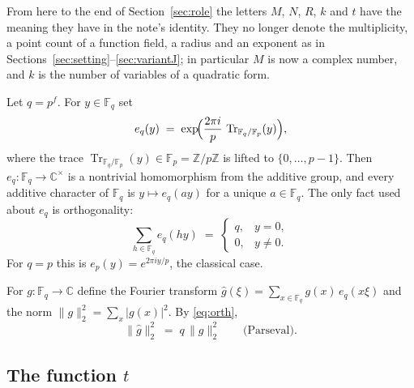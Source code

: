 \documentclass[11pt]{amsbook}
\theoremstyle{plain}
\theoremstyle{definition}
\theoremstyle{remark}
\numberwithin{equation}{section}
\numberwithin{figure}{chapter}
\numberwithin{table}{chapter}
\newcommand{\Z}{\mathbb{Z}}
\renewcommand{\C}{\mathbb{C}}
\newcommand{\F}{\mathbb{F}}
\newcommand{\Tr}{\operatorname{Tr}}
\begin{document}
From here to the end of Section~\ref{sec:role} the letters $M$,
$N$, $R$, $k$ and $t$ have the meaning they have in the note's
identity. They no longer denote the multiplicity, a point count of
a function field, a radius and an exponent as in
Sections~\ref{sec:setting}--\ref{sec:variantJ}; in particular $M$
is now a complex number, and $k$ is the number of variables of a
quadratic form.

Let $q = p^f$. For $y \in \F_q$ set
\[
  e_q(y) \;=\; \exp\!\Bigl(\frac{2\pi i}{p}\,
  \Tr_{\F_q/\F_p}(y)\Bigr),
\]
where the trace $\Tr_{\F_q/\F_p}(y) \in \F_p = \Z/p\Z$ is lifted to
$\{0, \dots, p-1\}$. Then $e_q \colon \F_q \to \C^\times$ is a
nontrivial homomorphism from the additive group, and every additive
character of $\F_q$ is $y \mapsto e_q(ay)$ for a unique
$a \in \F_q$. The only fact used about $e_q$ is orthogonality:
\begin{equation}\label{eq:orth}
  \sum_{h \in \F_q} e_q(hy) \;=\;
  \begin{cases} q, & y = 0,\\ 0, & y \ne 0.\end{cases}
\end{equation}
For $q = p$ this is $e_p(y) = e^{2\pi i y/p}$, the classical case.

For $g \colon \F_q \to \C$ define the Fourier transform
$\widehat g(\xi) = \sum_{x\in\F_q} g(x)\,e_q(x\xi)$ and the norm
$\|g\|_2^2 = \sum_x |g(x)|^2$. By \eqref{eq:orth},
\begin{equation}\label{eq:parseval}
  \|\widehat g\|_2^2 \;=\; q\,\|g\|_2^2 \qquad\text{(Parseval).}
\end{equation}

\subsection{The function $t$}\label{subsec:t}
\end{document}
